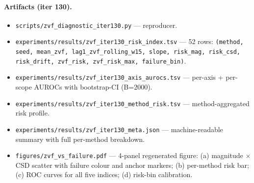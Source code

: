 \paragraph{Artifacts (iter 130).}
\begin{itemize}
\item \texttt{scripts/zvf\_diagnostic\_iter130.py} --- reproducer.
\item \texttt{experiments/results/zvf\_iter130\_risk\_index.tsv} ---
52 rows: \texttt{(method, seed, mean\_zvf, lag1\_zvf\_rolling\_w15,
slope, risk\_mag, risk\_csd, risk\_drift, zvf\_risk, zvf\_risk\_max,
failure\_bin)}.
\item \texttt{experiments/results/zvf\_iter130\_axis\_aurocs.tsv} ---
per-axis + per-scope AUROCs with bootstrap-CI (B=2000).
\item \texttt{experiments/results/zvf\_iter130\_method\_risk.tsv} ---
method-aggregated risk profile.
\item \texttt{experiments/results/zvf\_iter130\_meta.json} ---
machine-readable summary with full per-method breakdown.
\item \texttt{figures/zvf\_vs\_failure.pdf} --- 4-panel
regenerated figure: (a) magnitude $\times$ CSD scatter with failure
colour and anchor markers; (b) per-method risk bar; (c) ROC curves
for all five indices; (d) risk-bin calibration.
\end{itemize}
